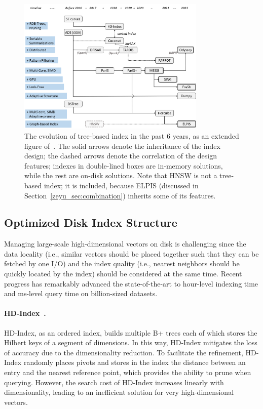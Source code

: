 \documentclass[11pt]{article}
\begin{document}
\begin{figure}[t]
\centering
    \includegraphics[width=0.8\textwidth]{submissions/Zeyu2023/figs/tree-evo.png}
    \caption{
    The evolution of tree-based index in the past 6 years, as an extended figure of~\cite{evolution}. The solid arrows denote the inheritance of the index design; the dashed arrows denote the correlation of the design features; indexes in double-lined boxes are in-memory solutions, while the rest are on-disk solutions. Note that HNSW is not a tree-based index; it is included, because ELPIS (discussed in Section~\ref{zeyu_sec:combination}) inherits some of its features.}
    \label{zeyu_fig:evo-tree}
\end{figure}

\subsection{Optimized Disk Index Structure}
Managing large-scale high-dimensional vectors on disk is challenging since the data locality (i.e., similar vectors should be placed together such that they can be fetched by one I/O) and the index quality (i.e., nearest neighbors should be quickly located by the index) should be considered at the same time.
Recent progress has remarkably advanced the state-of-the-art to hour-level indexing time and ms-level query time on billion-sized datasets.

\paragraph{HD-Index~\cite{hd-index}.}
HD-Index, as an ordered index, builds multiple B+ trees each of which stores the Hilbert keys of a segment of dimensions.
In this way, HD-Index mitigates the loss of accuracy due to the dimensionality reduction.
To facilitate the refinement, HD-Index randomly places pivots and stores in the index the distance between an entry and the nearest reference point, which provides the ability to prune when querying.
However, the search cost of HD-Index increases linearly with dimensionality, leading to an inefficient solution for very high-dimensional vectors.
\end{document}
